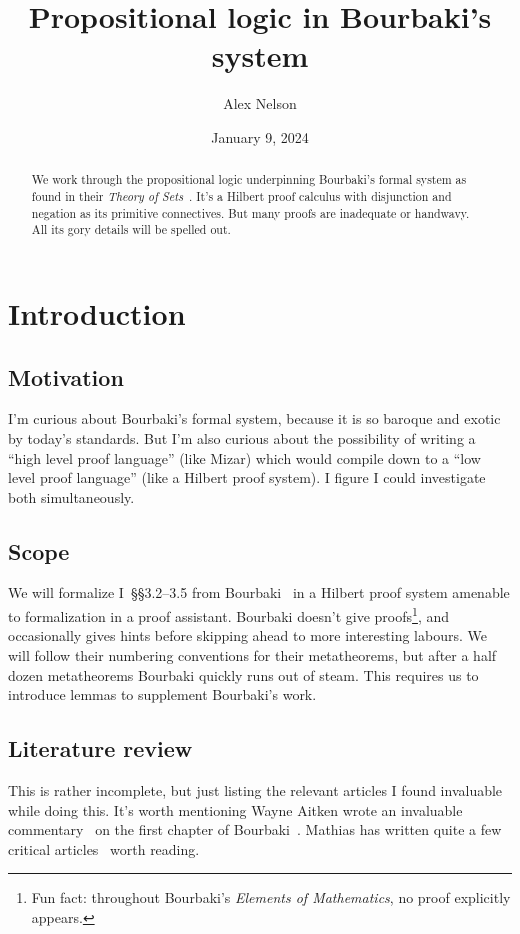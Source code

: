\documentclass{amsart}%
\title{Propositional logic in Bourbaki's system}
\author{Alex Nelson}
\date{January 9, 2024}
\begin{document}
\maketitle

\begin{abstract}
We work through the propositional logic underpinning Bourbaki's formal
system as found in their \textit{Theory of Sets}~\cite{bourbaki1970sets}.
It's a Hilbert proof calculus with disjunction and negation as its
primitive connectives. But many proofs are inadequate or handwavy. All
its gory details will be spelled out.
\end{abstract}

\section{Introduction}

\subsection{Motivation}
I'm curious about Bourbaki's formal system, because it is so baroque and
exotic by today's standards. But I'm also curious about the possibility
of writing a ``high level proof language'' (like Mizar) which would
compile down to a ``low level proof language'' (like a Hilbert proof system).
I figure I could investigate both simultaneously.

\subsection{Scope}
We will formalize I~\S\S3.2--3.5 from Bourbaki~\cite{bourbaki1970sets}
in a Hilbert proof system amenable to formalization in a proof assistant.
Bourbaki doesn't give proofs\footnote{Fun fact: throughout Bourbaki's
\textit{Elements of Mathematics}, no proof explicitly appears.}, and
occasionally gives hints before skipping ahead to more interesting labours.
We will follow their numbering conventions for their metatheorems, but
after a half dozen metatheorems Bourbaki quickly runs out of steam. This
requires us to introduce lemmas to supplement Bourbaki's work.

\subsection{Literature review} This is rather incomplete, but just
listing the relevant articles I found invaluable while doing this.
It's worth mentioning Wayne Aitken wrote an invaluable
commentary~\cite{aitken2023} on the first chapter of
Bourbaki~\cite{bourbaki1970sets}. Mathias has written quite a few
critical articles~\cite{mathias1992ignorance,mathias2002term,mathias2014hilbert}
worth reading.
\end{document}
